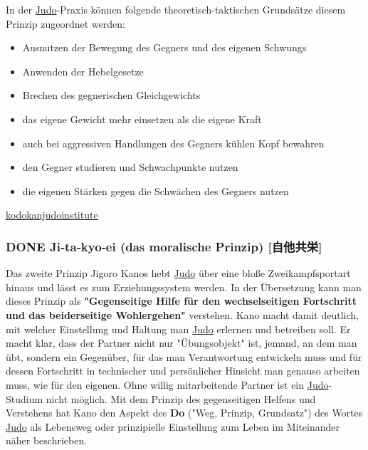 \documentclass[11pt]{article}
\begin{document}
In der \hyperref[org5f8b831]{Judo}-Praxis können folgende theoretisch-taktischen Grundsätze diesem Prinzip zugeordnet werden: 
\begin{itemize}
\item Ausnutzen der Bewegung des Gegners und des eigenen Schwungs
\item Anwenden der Hebelgesetze
\item Brechen des gegnerischen Gleichgewichts
\item das eigene Gewicht mehr einsetzen als die eigene Kraft
\item auch bei aggressiven Handlungen des Gegners kühlen Kopf bewahren
\item den Gegner studieren und Schwachpunkte nutzen
\item die eigenen Stärken gegen die Schwächen des Gegners nutzen
\end{itemize}

\href{http://kodokanjudoinstitute.org/en/doctrine/word/seiryoku-zenyo/}{kodokanjudoinstitute}

\subsubsection{{\bfseries\sffamily DONE} Ji‐ta‐kyo‐ei (das moralische Prinzip) [自他共栄]}
\label{sec:org5b94002}
Das zweite Prinzip Jigoro Kanos hebt \hyperref[org5f8b831]{Judo} über eine bloße Zweikampfsportart hinaus und lässt es zum Erziehungssystem werden. In der Übersetzung kann man dieses Prinzip als \textbf{"Gegenseitige Hilfe für den wechselseitigen Fortschritt und das beiderseitige Wohlergehen"} verstehen. Kano macht damit deutlich, mit welcher Einstellung und Haltung man \hyperref[org5f8b831]{Judo} erlernen und betreiben soll. Er macht klar, dass der Partner nicht nur "Übungsobjekt" ist, jemand, an dem man übt, sondern ein Gegenüber, für das man Verantwortung entwickeln muss und für dessen Fortschritt in technischer und persönlicher Hinsicht man genauso arbeiten muss, wie für den eigenen. Ohne willig mitarbeitende Partner ist ein \hyperref[org5f8b831]{Judo}-Studium nicht möglich. Mit dem Prinzip des gegenseitigen Helfens und Verstehens hat Kano den Aspekt des \textbf{Do} ("Weg, Prinzip, Grundsatz") des Wortes \hyperref[org5f8b831]{Judo} als Lebensweg oder prinzipielle Einstellung zum Leben im Miteinander näher beschrieben. 
\end{document}
